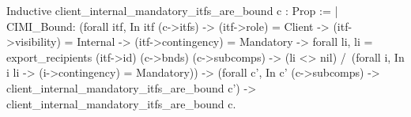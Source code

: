 Inductive client_internal_mandatory_itfs_are_bound c : Prop :=
 | CIMI_Bound: 
  (forall itf, In itf (c->itfs) -> (itf->role)  = Client ->
   (itf->visibility) = Internal -> (itf->contingency) = Mandatory ->  
   forall li, 
    li = export_recipients (itf->id) (c->bnds) (c->subcomps) ->
    (li <> nil) /\ 
        (forall i, In i li -> (i->contingency) = Mandatory)) ->
    (forall c', In c' (c->subcomps) -> 
        client_internal_mandatory_itfs_are_bound c')        ->
    client_internal_mandatory_itfs_are_bound c.